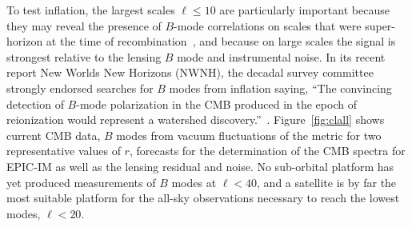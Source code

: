 To test inflation, the largest scales $\ell \leq 10$ are particularly important because they may reveal 
the presence of $B$-mode correlations on scales that were super-horizon at the time of 
recombination~\cite{Lee:2014cya}, 
and because on large scales the signal is strongest relative to the lensing $B$ mode and instrumental 
noise.
In its recent report New Worlds New Horizons (NWNH), the decadal survey committee strongly endorsed 
searches for $B$ modes from inflation saying, ``The convincing detection of $B$-mode polarization in 
the CMB produced in the epoch of reionization would represent a watershed discovery.''~\cite{blandford2010}. 
 Figure~\ref{fig:clall} shows current CMB data, $B$ modes from vacuum fluctuations of the metric 
for two representative values of $r$, forecasts for the determination 
of the \ac{CMB} spectra for EPIC-IM as well as the lensing residual and noise.
No sub-orbital platform has yet produced measurements of $B$ modes at $\ell< 40$, and a satellite is by 
far the most suitable platform for the all-sky observations necessary to reach the lowest modes, $\ell<20$. 
